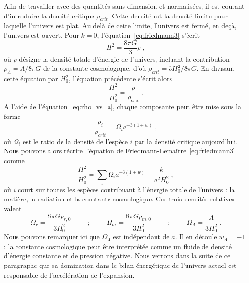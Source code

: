 Afin de travailler avec des quantités sans dimension et normalisées, il est courant d'introduire la densité critique $\rho_{crit}$. Cette densité est la densité limite pour laquelle l'univers est plat. Au delà de cette limite, l'univers est fermé, en deçà, l'univers est ouvert. Pour $k = 0$, l'équation~\ref{eq:friedmann3} s'écrit
\begin{equation}
  H^{2} = \frac{8 \pi G }{3} \rho  \; ,
\end{equation}
où $\rho$ désigne la densité totale d'énergie de l'univers, incluant la contribution $\rho_{\Lambda} = \Lambda / 8 \pi G$ de la constante cosmologique, d'où $\rho_{crit} = 3 H_0^2 / 8 \pi G$. En divisant cette équation par $H_{0}^{2}$, l'équation précédente s'écrit alors
\begin{equation}
  \label{eq:friedmann5}
  \frac{H^2}{H_0^2} = \frac{\rho}{\rho_{crit}}  \; .
\end{equation}
A l'aide de l'équation~\ref{eq:rho_vs_a}, chaque composante peut être mise sous la forme
\begin{equation}
  \label{eq:def_omgega}
  \frac{\rho_i}{\rho_{crit}} = \Omega_i a^{-3 (1+w)}  \; , 
\end{equation}
où $\Omega_i$ est le ratio de la densité de l'espèce $i$ par la densité critique aujourd'hui. Nous pouvons alors récrire l'équation de Friedmann-Lemaître~\ref{eq:friedmann3} comme
\begin{equation}
  \label{eq:friedmann6}
  \frac{H^2}{H_0^2} = \sum\limits_i \Omega_i a^{-3 (1+w)} - \frac{k}{a^{2} H_{0}^{2}} \; ,
\end{equation}
où $i$ court sur toutes les espèces contribuant à l'énergie totale de l'univers : la matière, la radiation et la constante cosmologique. Ces trois densités relatives valent
\begin{equation}
  \label{eq:def_omega2}
\Omega_{r} = \frac{8 \pi G \rho_{r, 0}}{3 H_{0}^{2}} \hspace{1cm} ; \hspace{1cm} \Omega_{m} = \frac{8 \pi G \rho_{m, 0}}{3 H_{0}^{2}} \hspace{1cm} ;\hspace{1cm} \Omega_{\Lambda} = \frac{\Lambda}{3 H_{0}^{2}}  \; .
\end{equation}
Nous pouvons remarquer ici que $\Omega_{\Lambda}$ est indépendant de $a$. Il en découle $w_{\Lambda} = -1$ : la constante cosmologique peut être interprétée comme un fluide de densité d'énergie constante et de pression négative. Nous verrons dans la suite de ce paragraphe que sa domination dans le bilan énergétique de l'univers actuel est responsable de l'accélération de l'expansion.
